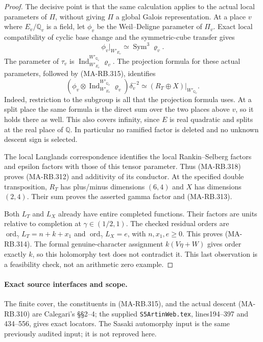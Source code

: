 \begin{proof}
The decisive point is that the same calculation applies to
the actual local parameters of \(\Pi\), without giving
\(\Pi\) a global Galois representation. At a place \(v\)
where \(E_v/\mathbb Q_v\) is a field, let \(\phi_v\)
be the Weil--Deligne parameter of \(\Pi_v\). Exact local
compatibility of cyclic base change and the symmetric-cube
transfer gives
\[
 \phi_v|_{W'_{E_v}}\simeq
                         \operatorname{Sym}^3\varrho_v.
 \tag{MA-RB.317}
\]
The parameter of \(\tau_v\) is
\(\operatorname{Ind}_{W'_{E_v}}^{W'_{\mathbb Q_v}}
\varrho_v\). The projection formula for these actual
parameters, followed by (MA-RB.315), identifies
\[
 (\phi_v\otimes
    \operatorname{Ind}_{W'_{E_v}}^{W'_{\mathbb Q_v}}
        \varrho_v)\delta_v^{-2}
       \simeq (R_T\oplus X)|_{W'_{\mathbb Q_v}}.
 \tag{MA-RB.318}
\]
Indeed, restriction to the subgroup is all that the
projection formula uses. At a split place the same formula
is the direct sum over the two places above \(v\), so it
holds there as well. This also covers infinity, since
\(E\) is real quadratic and splits at the real place of
\(\mathbb Q\). In particular no ramified factor is
deleted and no unknown descent sign is selected.

The local Langlands correspondence identifies the local
Rankin--Selberg factors and epsilon factors with those of
this tensor parameter. Thus (MA-RB.318) proves (MA-RB.312)
and additivity of its conductor. At the specified double
transposition, \(R_T\) has plus/minus dimensions \((6,4)\)
and \(X\) has dimensions \((2,4)\). Their sum proves
the asserted gamma factor and (MA-RB.313).

Both \(L_T\) and \(L_X\) already have entire completed
functions. Their factors are units relative to completion
at \(\gamma\in(1/2,1)\). The checked residual orders are
\(\operatorname{ord}_{\gamma}L_T=n+k+x_1\) and
\(\operatorname{ord}_{\gamma}L_X=e\), with
\(n,x_1,e\ge0\). This proves (MA-RB.314). The formal
genuine-character assignment \(k(V\eta+W)\) gives
order exactly \(k\), so this holomorphy test does not
contradict it. This last observation is a feasibility
check, not an arithmetic zero example.
\end{proof}

\paragraph{Exact source interfaces and scope.}
The finite cover, the constituents in (MA-RB.315), and
the actual descent (MA-RB.310) are Calegari's \S\S2--4;
the supplied \texttt{S5ArtinWeb.tex}, lines194--397 and
434--556, gives exact locators. The Sasaki automorphy
input is the same previously audited input; it is not
reproved here.

